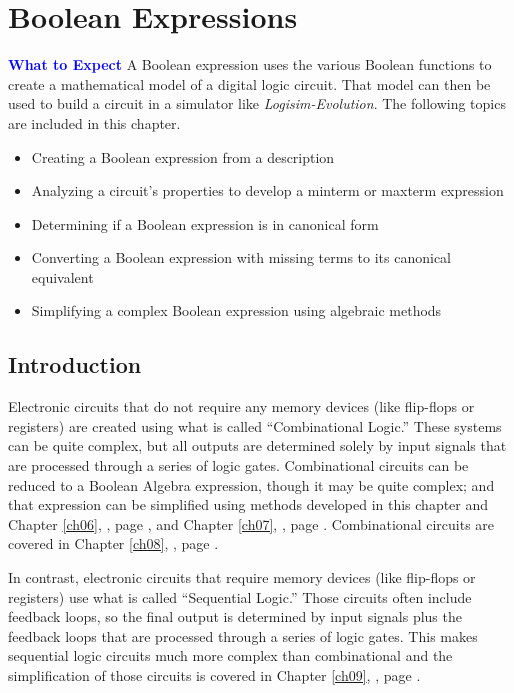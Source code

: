 \chapter{Boolean Expressions}\label{ch05}

\begin{tcolorbox}[colback=blue!5!white,colframe=blue!75!black]
	\textcolor{blue}{\textbf{What to Expect}}
	\tcblower
	A Boolean expression uses the various Boolean functions to create a mathematical model of a digital logic circuit. That model can then be used to build a circuit in a simulator like \textit{Logisim-Evolution}. The following topics are included in this chapter.
	
	\begin{itemize}
		\item Creating a Boolean expression from a description
		\item Analyzing a circuit's properties to develop a minterm or maxterm expression
		\item Determining if a Boolean expression is in canonical form
		\item Converting a Boolean expression with missing terms to its canonical equivalent
		\item Simplifying a complex Boolean expression using algebraic methods
	\end{itemize}
	
\end{tcolorbox}

\section{Introduction}

Electronic circuits that do not require any memory devices (like flip-flops or registers) are created using what is called ``Combinational Logic.'' These systems can be quite complex, but all outputs are determined solely by input signals that are processed through a series of logic gates. Combinational circuits can be reduced to a Boolean Algebra expression, though it may be quite complex; and that expression can be simplified using methods developed in this chapter and Chapter \ref{ch06}, , page \pageref{ch06}, and Chapter \ref{ch07}, , page \pageref{ch07}. Combinational circuits are covered in Chapter \ref{ch08}, , page \pageref{ch08}.

In contrast, electronic circuits that require memory devices (like flip-flops or registers) use what is called ``Sequential Logic.'' Those circuits often include feedback loops, so the final output is determined by input signals plus the feedback loops that are processed through a series of logic gates. This makes sequential logic circuits much more complex than combinational and the simplification of those circuits is covered in Chapter \ref{ch09}, , page \pageref{ch09}. 

